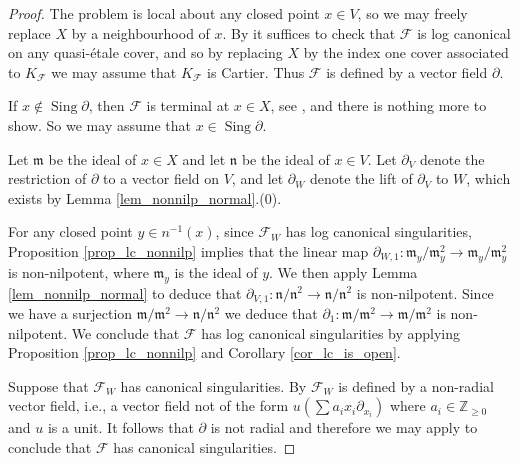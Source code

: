 \documentclass[12pt, a4paper]{amsart}
\DeclareMathOperator{\sing}{Sing}
\theoremstyle{definition}
\theoremstyle{named}
\begin{document}
 \begin{proof}
The problem is local about any closed point $x \in V$, so 
we may freely replace $X$ by a neighbourhood 
of $x$.
By \cite[Lemma 2.20]{SS23} it suffices to check that $\mathcal F$ is log canonical 
on any quasi-\'etale cover, and so by replacing $X$ by the index one
cover associated to $K_{\mathcal F}$ we may assume that 
$K_{\mathcal F}$ is Cartier.  Thus $\mathcal F$
is defined by a vector field $\partial$.

If $x \notin \sing \partial$, 
then $\mathcal F$ is terminal at $x \in X$, see \cite[Fact III.i.1]{MP13},
and there is nothing more to show.  So we may
assume that $x \in \sing \partial$.


Let $\mathfrak m$ be the ideal of $x \in X$ and let 
$\mathfrak n$ be the ideal of $x \in V$. 
Let $\partial_V$ denote the restriction of $\partial$
to a vector field on $V$, and let $\partial_W$ denote the lift of 
$\partial_V$ to $W$, which exists by Lemma \ref{lem_nonnilp_normal}.(0).

For any closed point $y \in n^{-1}(x)$, since $\mathcal F_W$ has log canonical singularities, Proposition \ref{prop_lc_nonnilp} implies that
the linear map 
$\partial_{W, 1} \colon \mathfrak m_y/\mathfrak m_y^2 \to \mathfrak m_y/\mathfrak m_y^2$ is non-nilpotent, where
$\mathfrak m_y$ is the ideal of $y$.
  We then apply Lemma \ref{lem_nonnilp_normal}
to deduce that $\partial_{V, 1}\colon \mathfrak n/\mathfrak n^2 \rightarrow \mathfrak n/\mathfrak n^2$ is non-nilpotent.
Since we have a surjection $\mathfrak m/\mathfrak m^2 \rightarrow \mathfrak n/\mathfrak n^2$
we deduce that $\partial_1 \colon \mathfrak m/\mathfrak m^2 \rightarrow \mathfrak m/\mathfrak m^2$ is non-nilpotent.
We conclude that $\mathcal F$ has log canonical singularities by applying Proposition \ref{prop_lc_nonnilp} and Corollary \ref{cor_lc_is_open}.

Suppose that $\mathcal F_W$ has canonical singularities.
By \cite[Fact III.i.3]{MP13} $\mathcal F_W$ is defined 
by a non-radial vector field, i.e., a vector field not of the form $u(\sum a_i x_i \partial_{x_i})$ where $a_i \in \mathbb Z_{\ge 0}$ and $u$ is a unit.  It follows that $\partial$ is not radial and therefore we may apply \cite[Fact III.i.3]{MP13}
to conclude that $\mathcal F$ has canonical singularities.
 \end{proof}
\end{document}
